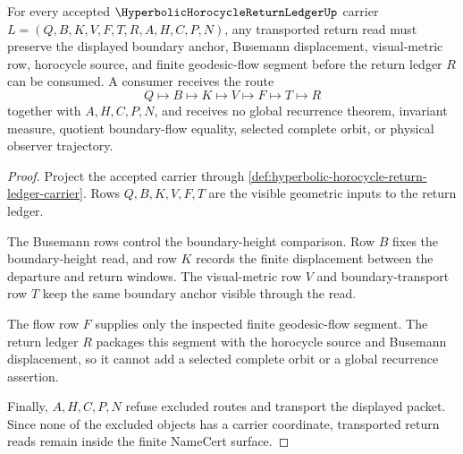 \begin{theorem}
\label{thm:hyperbolic-horocycle-return-ledger-transport-nonescape}
For every accepted $\HyperbolicHorocycleReturnLedgerUp$ carrier $L=(Q,B,K,V,F,T,R,A,H,C,P,N)$, any transported return read must preserve the displayed boundary anchor, Busemann displacement, visual-metric row, horocycle source, and finite geodesic-flow segment before the return ledger $R$ can be consumed. A consumer receives the route
$$
Q\longmapsto B\longmapsto K\longmapsto V\longmapsto F\longmapsto T\longmapsto R
$$
together with $A,H,C,P,N$, and receives no global recurrence theorem, invariant measure, quotient boundary-flow equality, selected complete orbit, or physical observer trajectory.
\end{theorem}
\begin{proof}
Project the accepted carrier through \autoref{def:hyperbolic-horocycle-return-ledger-carrier}. Rows $Q,B,K,V,F,T$ are the visible geometric inputs to the return ledger.

The Busemann rows control the boundary-height comparison. Row $B$ fixes the boundary-height read, and row $K$ records the finite displacement between the departure and return windows. The visual-metric row $V$ and boundary-transport row $T$ keep the same boundary anchor visible through the read.

The flow row $F$ supplies only the inspected finite geodesic-flow segment. The return ledger $R$ packages this segment with the horocycle source and Busemann displacement, so it cannot add a selected complete orbit or a global recurrence assertion.

Finally, $A,H,C,P,N$ refuse excluded routes and transport the displayed packet. Since none of the excluded objects has a carrier coordinate, transported return reads remain inside the finite NameCert surface.
\end{proof}

